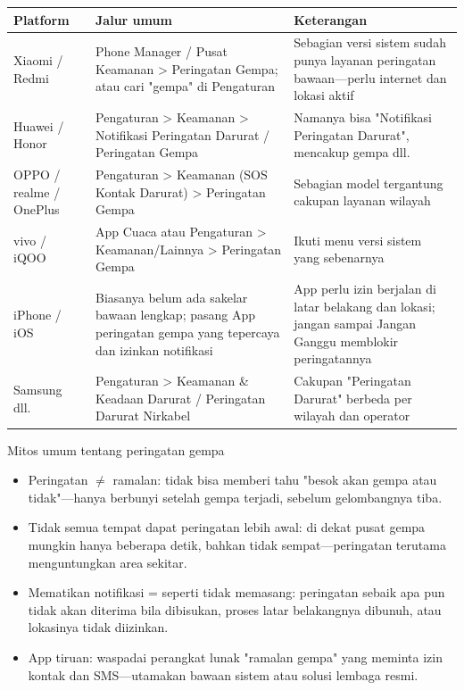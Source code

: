 \begin{center}
\begin{tabularx}{\linewidth}{|X|X|X|}
\hline
\textbf{Platform} & \textbf{Jalur umum} & \textbf{Keterangan} \tabularnewline
\hline
Xiaomi / Redmi & Phone Manager / Pusat Keamanan > Peringatan Gempa; atau cari "gempa" di Pengaturan & Sebagian versi sistem sudah punya layanan peringatan bawaan—perlu internet dan lokasi aktif \tabularnewline
Huawei / Honor & Pengaturan > Keamanan > Notifikasi Peringatan Darurat / Peringatan Gempa & Namanya bisa "Notifikasi Peringatan Darurat", mencakup gempa dll. \tabularnewline
OPPO / realme / OnePlus & Pengaturan > Keamanan (SOS Kontak Darurat) > Peringatan Gempa & Sebagian model tergantung cakupan layanan wilayah \tabularnewline
vivo / iQOO & App Cuaca atau Pengaturan > Keamanan/Lainnya > Peringatan Gempa & Ikuti menu versi sistem yang sebenarnya \tabularnewline
iPhone / iOS & Biasanya belum ada sakelar bawaan lengkap; pasang App peringatan gempa yang tepercaya dan izinkan notifikasi & App perlu izin berjalan di latar belakang dan lokasi; jangan sampai Jangan Ganggu memblokir peringatannya \tabularnewline
Samsung dll. & Pengaturan > Keamanan \& Keadaan Darurat / Peringatan Darurat Nirkabel & Cakupan "Peringatan Darurat" berbeda per wilayah dan operator \tabularnewline
\hline
\end{tabularx}
\end{center}

\begin{tcbwarn}{Mitos umum tentang peringatan gempa}
\begin{itemize}
  \item Peringatan $\neq$ ramalan: tidak bisa memberi tahu "besok akan gempa atau tidak"—hanya berbunyi setelah gempa terjadi, sebelum gelombangnya tiba.
  \item Tidak semua tempat dapat peringatan lebih awal: di dekat pusat gempa mungkin hanya beberapa detik, bahkan tidak sempat—peringatan terutama menguntungkan area sekitar.
  \item Mematikan notifikasi = seperti tidak memasang: peringatan sebaik apa pun tidak akan diterima bila dibisukan, proses latar belakangnya dibunuh, atau lokasinya tidak diizinkan.
  \item App tiruan: waspadai perangkat lunak "ramalan gempa" yang meminta izin kontak dan SMS—utamakan bawaan sistem atau solusi lembaga resmi.
\end{itemize}

\end{tcbwarn}

